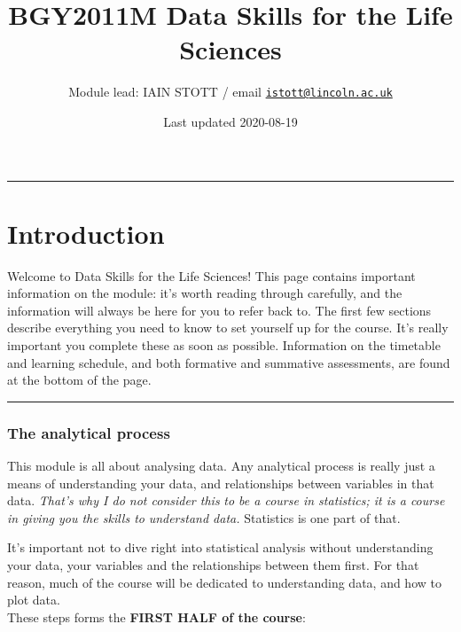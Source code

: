 \documentclass[
]{book}
\title{BGY2011M Data Skills for the Life Sciences}
\author{Module lead: IAIN STOTT / email \href{mailto:istott@lincoln.ac.uk}{\nolinkurl{istott@lincoln.ac.uk}}}
\date{Last updated 2020-08-19}
\begin{document}
\maketitle

{
\setcounter{tocdepth}{1}
\tableofcontents
}
\begin{center}\rule{0.5\linewidth}{\linethickness}\end{center}

\hypertarget{introduction}{%
\chapter{Introduction}\label{introduction}}

Welcome to Data Skills for the Life Sciences! This page contains important
information on the module: it's worth reading through carefully, and the
information will always be here for you to refer back to. The first few sections
describe everything you need to know to set yourself up for the course. It's
really important you complete these as soon as possible. Information on the
timetable and learning schedule, and both formative and summative assessments,
are found at the bottom of the page.

\begin{center}\rule{0.5\linewidth}{\linethickness}\end{center}

\hypertarget{the-analytical-process}{%
\subsection{The analytical process}\label{the-analytical-process}}

This module is all about analysing data.
Any analytical process is really just a means of understanding your data, and
relationships between variables in that data. \emph{That's why I do not consider this}
\emph{to be a course in statistics; it is a course in giving you the skills to}
\emph{understand data.} Statistics is one part of that.

It's important not to dive right into statistical analysis without
understanding your data, your variables and the relationships between them
first. For that reason, much of the course will be dedicated to understanding
data, and how to plot data.\\
These steps forms the \textbf{FIRST HALF of the course}:
\end{document}
